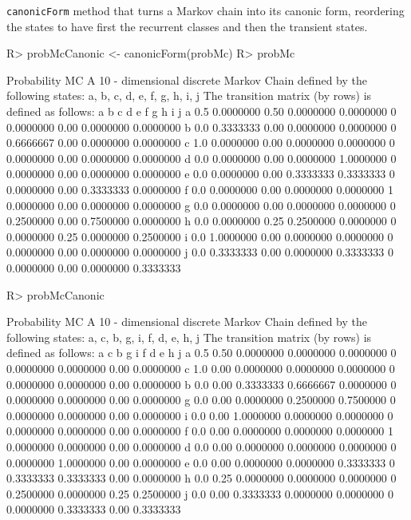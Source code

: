\documentclass[
  nojss]{jss}
\begin{document}
\texttt{canonicForm} method that turns a Markov chain into its canonic form, reordering the states to have first the
recurrent classes and then the transient states.

\begin{CodeChunk}

\begin{CodeInput}
R> probMcCanonic <- canonicForm(probMc)
R> probMc
\end{CodeInput}

\begin{CodeOutput}
Probability MC 
 A  10 - dimensional discrete Markov Chain defined by the following states: 
 a, b, c, d, e, f, g, h, i, j 
 The transition matrix  (by rows)  is defined as follows: 
    a         b    c         d         e f         g    h         i         j
a 0.5 0.0000000 0.50 0.0000000 0.0000000 0 0.0000000 0.00 0.0000000 0.0000000
b 0.0 0.3333333 0.00 0.0000000 0.0000000 0 0.6666667 0.00 0.0000000 0.0000000
c 1.0 0.0000000 0.00 0.0000000 0.0000000 0 0.0000000 0.00 0.0000000 0.0000000
d 0.0 0.0000000 0.00 0.0000000 1.0000000 0 0.0000000 0.00 0.0000000 0.0000000
e 0.0 0.0000000 0.00 0.3333333 0.3333333 0 0.0000000 0.00 0.3333333 0.0000000
f 0.0 0.0000000 0.00 0.0000000 0.0000000 1 0.0000000 0.00 0.0000000 0.0000000
g 0.0 0.0000000 0.00 0.0000000 0.0000000 0 0.2500000 0.00 0.7500000 0.0000000
h 0.0 0.0000000 0.25 0.2500000 0.0000000 0 0.0000000 0.25 0.0000000 0.2500000
i 0.0 1.0000000 0.00 0.0000000 0.0000000 0 0.0000000 0.00 0.0000000 0.0000000
j 0.0 0.3333333 0.00 0.0000000 0.3333333 0 0.0000000 0.00 0.0000000 0.3333333
\end{CodeOutput}

\begin{CodeInput}
R> probMcCanonic
\end{CodeInput}

\begin{CodeOutput}
Probability MC 
 A  10 - dimensional discrete Markov Chain defined by the following states: 
 a, c, b, g, i, f, d, e, h, j 
 The transition matrix  (by rows)  is defined as follows: 
    a    c         b         g         i f         d         e    h         j
a 0.5 0.50 0.0000000 0.0000000 0.0000000 0 0.0000000 0.0000000 0.00 0.0000000
c 1.0 0.00 0.0000000 0.0000000 0.0000000 0 0.0000000 0.0000000 0.00 0.0000000
b 0.0 0.00 0.3333333 0.6666667 0.0000000 0 0.0000000 0.0000000 0.00 0.0000000
g 0.0 0.00 0.0000000 0.2500000 0.7500000 0 0.0000000 0.0000000 0.00 0.0000000
i 0.0 0.00 1.0000000 0.0000000 0.0000000 0 0.0000000 0.0000000 0.00 0.0000000
f 0.0 0.00 0.0000000 0.0000000 0.0000000 1 0.0000000 0.0000000 0.00 0.0000000
d 0.0 0.00 0.0000000 0.0000000 0.0000000 0 0.0000000 1.0000000 0.00 0.0000000
e 0.0 0.00 0.0000000 0.0000000 0.3333333 0 0.3333333 0.3333333 0.00 0.0000000
h 0.0 0.25 0.0000000 0.0000000 0.0000000 0 0.2500000 0.0000000 0.25 0.2500000
j 0.0 0.00 0.3333333 0.0000000 0.0000000 0 0.0000000 0.3333333 0.00 0.3333333
\end{CodeOutput}
\end{CodeChunk}
\end{document}
